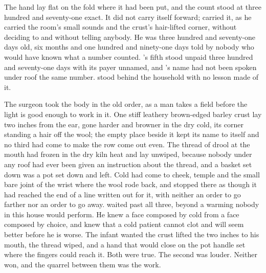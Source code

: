 The hand lay flat on the fold where it had been put, and the count stood at three hundred and seventy-one exact. It did not carry itself forward;  carried it, as he carried the room's small sounds and the crust's hair-lifted corner, without deciding to and without telling anybody. He was three hundred and seventy-one days old, six months and one hundred and ninety-one days told by nobody who would have known what a number counted. 's fifth stood unpaid three hundred and seventy-one days with its payer unnamed, and 's name had not been spoken under  roof the same number.  stood behind the household with no lesson made of it.

The surgeon took the body in the old order, as a man takes a field before the light is good enough to work in it. One stiff leathery brown-edged barley crust lay two inches from the ear, gone harder and browner in the dry cold, its corner standing a hair off the wool; the empty place beside it kept its name to itself and no third had come to make the row come out even. The thread of drool at the mouth had frozen in the dry kiln heat and lay unwiped, because nobody under any roof had ever been given an instruction about the thread, and a basket set down was a pot set down and left. Cold had come to cheek, temple and the small bare joint of the wrist where the wool rode back, and stopped there as though it had reached the end of a line written out for it, with neither an order to go farther nor an order to go away.  waited past all three, beyond a warming nobody in this house would perform. He knew a face composed by cold from a face composed by choice, and knew that a cold patient cannot clot and will seem better before he is worse. The infant wanted the crust lifted the two inches to his mouth, the thread wiped, and a hand that would close on the pot handle set where the fingers could reach it. Both were true. The second was louder. Neither won, and the quarrel between them was the work.

